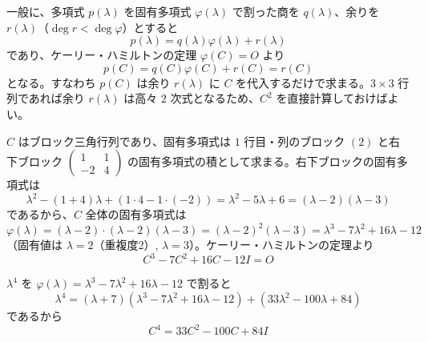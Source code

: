 
一般に、多項式 $p(\lambda)$ を固有多項式 $\varphi(\lambda)$ で割った商を $q(\lambda)$、余りを $r(\lambda)$（$\deg r < \deg \varphi$）とすると
\[
p(\lambda) = q(\lambda)\varphi(\lambda) + r(\lambda)
\]
であり、ケーリー・ハミルトンの定理 $\varphi(C) = O$ より
\[
p(C) = q(C)\varphi(C) + r(C) = r(C)
\]
となる。すなわち $p(C)$ は余り $r(\lambda)$ に $C$ を代入するだけで求まる。$3\times3$ 行列であれば余り $r(\lambda)$ は高々 $2$ 次式となるため、$C^{2}$ を直接計算しておけばよい。

$C$ はブロック三角行列であり、固有多項式は $1$ 行目・列のブロック $(2)$ と右下ブロック $\begin{pmatrix}1&1\\-2&4\end{pmatrix}$ の固有多項式の積として求まる。右下ブロックの固有多項式は
\[
\lambda^{2} - (1+4)\lambda + (1\cdot4 - 1\cdot(-2)) = \lambda^{2} - 5\lambda + 6 = (\lambda-2)(\lambda-3)
\]
であるから、$C$ 全体の固有多項式は
\[
\varphi(\lambda) = (\lambda - 2)\cdot(\lambda-2)(\lambda-3) = (\lambda-2)^{2}(\lambda-3) = \lambda^{3} - 7\lambda^{2} + 16\lambda - 12
\]
（固有値は $\lambda = 2$（重複度2）, $\lambda = 3$）。ケーリー・ハミルトンの定理より
\[
C^{3} - 7C^{2} + 16C - 12I = O
\]

$\lambda^{4}$ を $\varphi(\lambda) = \lambda^{3} - 7\lambda^{2} + 16\lambda - 12$ で割ると
\[
\lambda^{4} = (\lambda + 7)(\lambda^{3} - 7\lambda^{2} + 16\lambda - 12) + (33\lambda^{2} - 100\lambda + 84)
\]
であるから
\[
C^{4} = 33C^{2} - 100C + 84I
\]


